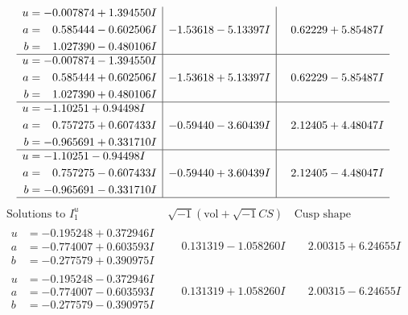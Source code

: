 \documentclass[1p]{elsarticle_modified}
\theoremstyle{definition}
\newcommand{\I}{\sqrt{-1}}
\begin{document}
$$\begin{array}{c|c|c}
\begin{aligned}
u &= -0.007874 + 1.394550 I \\
a &= \phantom{-}0.585444 - 0.602506 I \\
b &= \phantom{-}1.027390 - 0.480106 I\end{aligned}
 & -1.53618 - 5.13397 I & \phantom{-}0.62229 + 5.85487 I \\ \hline\begin{aligned}
u &= -0.007874 - 1.394550 I \\
a &= \phantom{-}0.585444 + 0.602506 I \\
b &= \phantom{-}1.027390 + 0.480106 I\end{aligned}
 & -1.53618 + 5.13397 I & \phantom{-}0.62229 - 5.85487 I \\ \hline\begin{aligned}
u &= -1.10251 + 0.94498 I \\
a &= \phantom{-}0.757275 + 0.607433 I \\
b &= -0.965691 + 0.331710 I\end{aligned}
 & -0.59440 - 3.60439 I & \phantom{-}2.12405 + 4.48047 I \\ \hline\begin{aligned}
u &= -1.10251 - 0.94498 I \\
a &= \phantom{-}0.757275 - 0.607433 I \\
b &= -0.965691 - 0.331710 I\end{aligned}
 & -0.59440 + 3.60439 I & \phantom{-}2.12405 - 4.48047 I\\
 \hline 
 \end{array}$$\newpage$$\begin{array}{c|c|c}  
\text{Solutions to }I^u_{1}& \I (\text{vol} + \sqrt{-1}CS) & \text{Cusp shape}\\
 \hline 
\begin{aligned}
u &= -0.195248 + 0.372946 I \\
a &= -0.774007 + 0.603593 I \\
b &= -0.277579 + 0.390975 I\end{aligned}
 & \phantom{-}0.131319 - 1.058260 I & \phantom{-}2.00315 + 6.24655 I \\ \hline\begin{aligned}
u &= -0.195248 - 0.372946 I \\
a &= -0.774007 - 0.603593 I \\
b &= -0.277579 - 0.390975 I\end{aligned}
 & \phantom{-}0.131319 + 1.058260 I & \phantom{-}2.00315 - 6.24655 I \\ \hline\begin{aligned}

\end{aligned}
\end{array}$$
\end{document}
